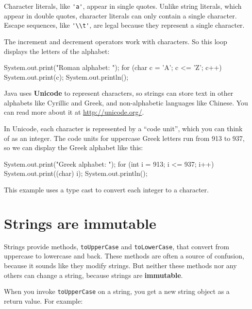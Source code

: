 \documentclass[12pt]{book}
\theoremstyle{exercise}
\newcommand{\java}[1]{\verb"#1"}
\begin{document}

Character literals, like \java{'a'}, appear in single quotes.
Unlike string literals, which appear in double quotes, character literals can only contain a single character.
Escape sequences, like \java{'\\t'}, are legal because they represent a single character.

The increment and decrement operators work with characters.
So this loop displays the letters of the alphabet:

\begin{code}
    System.out.print("Roman alphabet: ");
    for (char c = 'A'; c <= 'Z'; c++) {
        System.out.print(c);
    }
    System.out.println();
\end{code}


Java uses {\bf Unicode} to represent characters, so strings can store text in other alphabets like Cyrillic and Greek, and non-alphabetic languages like Chinese.
You can read more about it at \url{http://unicode.org/}.

In Unicode, each character is represented by a ``code unit'', which you can think of as an integer.
The code units for uppercase Greek letters run from 913 to 937, so we can display the Greek alphabet like this:

\begin{code}
    System.out.print("Greek alphabet: ");
    for (int i = 913; i <= 937; i++) {
        System.out.print((char) i);
    }
    System.out.println();
\end{code}

This example uses a type cast to convert each integer to a character.


\section{Strings are immutable}
\label{immutable}


Strings provide methods, \java{toUpperCase} and \java{toLowerCase}, that convert from uppercase to lowercase and back.
These methods are often a source of confusion, because it sounds like they modify strings.
But neither these methods nor any others can change a string, because strings are {\bf immutable}.

When you invoke \java{toUpperCase} on a string, you get a new string object as a return value.
For example:
\end{document}
